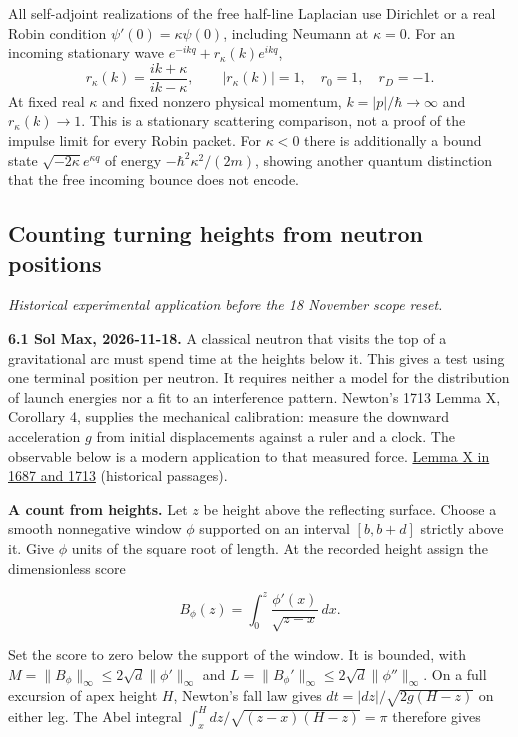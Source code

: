 \documentclass[11pt,a4paper]{article}
\begin{document}
All self-adjoint realizations of the free half-line Laplacian use
Dirichlet or a real Robin condition \(\psi'(0)=\kappa\psi(0)\),
including Neumann at \(\kappa=0\). For an incoming stationary wave
\(e^{-ikq}+r_\kappa(k)e^{ikq}\), \[
 r_\kappa(k)=\frac{ik+\kappa}{ik-\kappa},\qquad
 |r_\kappa(k)|=1,\quad
 r_0=1,\quad r_D=-1.\tag{12}
\] At fixed real \(\kappa\) and fixed nonzero physical momentum,
\(k=|p|/\hbar\to\infty\) and \(r_\kappa(k)\to1\). This is a stationary
scattering comparison, not a proof of the impulse limit for every Robin
packet. For \(\kappa<0\) there is additionally a bound state
\(\sqrt{-2\kappa}e^{\kappa q}\) of energy \(-\hbar^2\kappa^2/(2m)\),
showing another quantum distinction that the free incoming bounce does
not encode.

\subsection{Counting turning heights from neutron
positions}\label{counting-turning-heights-from-neutron-positions}

\emph{Historical experimental application before the 18 November scope
reset.}

\textbf{6.1 Sol Max, 2026-11-18.} A classical neutron that visits the
top of a gravitational arc must spend time at the heights below it. This
gives a test using one terminal position per neutron. It requires
neither a model for the distribution of launch energies nor a fit to an
interference pattern. Newton's 1713 Lemma X, Corollary 4, supplies the
mechanical calibration: measure the downward acceleration \(g\) from
initial displacements against a ruler and a clock. The observable below
is a modern application to that measured force.
\href{newton-insertion-action.md\#lemma-x-and-the-measurement-of-initial-force}{Lemma
X in 1687 and 1713} (historical passages).

\textbf{A count from heights.} Let \(z\) be height above the reflecting
surface. Choose a smooth nonnegative window \(\phi\) supported on an
interval \([b,b+d]\) strictly above it. Give \(\phi\) units of the
square root of length. At the recorded height assign the dimensionless
score

\[
 B_\phi(z)=\int_0^z\frac{\phi'(x)}{\sqrt{z-x}}\,dx .
\]

Set the score to zero below the support of the window. It is bounded,
with \(M=\|B_\phi\|_\infty\le
2\sqrt d\|\phi'\|_\infty\) and \(L=\|B_\phi'\|_\infty\le
2\sqrt d\|\phi''\|_\infty\). On a full excursion of apex height \(H\),
Newton's fall law gives \(dt=|dz|/\sqrt{2g(H-z)}\) on either leg. The
Abel integral \(\int_x^H dz/\sqrt{(z-x)(H-z)}=\pi\) therefore gives
\end{document}
